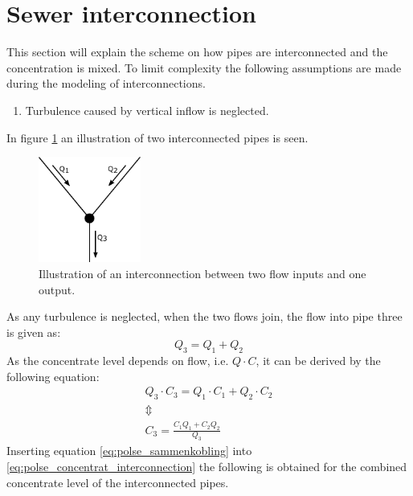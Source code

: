\section{Sewer interconnection}\label{se:sewer_interconnection}
This section will explain the scheme on how pipes are interconnected and the concentration is mixed.
To limit complexity the following assumptions are made during the modeling of interconnections.
\begin{enumerate}
	\item Turbulence caused by vertical inflow is neglected.
\end{enumerate}

In figure \ref{fig:interconnections} an illustration of two interconnected pipes is seen.

\begin{figure}[H]
\centering
\includegraphics[width=0.30\textwidth]{report/modeling/pictures/interconnections}
\caption{Illustration of an interconnection between two flow inputs and one output.}
\label{fig:interconnections}
\end{figure} 

As any turbulence is neglected, when the two flows join, the flow into pipe three is given as: 
\begin{equation} \label{eq:polse_sammenkobling} 
	\boxed{Q_3 = Q_1 + Q_2}
\end{equation} 
As the concentrate level depends on flow, i.e. $Q \cdot C$, it can be derived by the following equation: 
\begin{equation}\label{eq:polse_concentrat_interconnection}
\begin{array}{l}
	Q_3 \cdot C_3 = Q_1 \cdot C_1 + Q_2 \cdot C_2 \\
	\Updownarrow \\
	C_3 = \frac{C_1 Q_1 + C_2 Q_2}{Q_3}

\end{array}
\end{equation}
Inserting equation \ref{eq:polse_sammenkobling} into \ref{eq:polse_concentrat_interconnection} the following is obtained for the combined concentrate level of the interconnected pipes.
 
